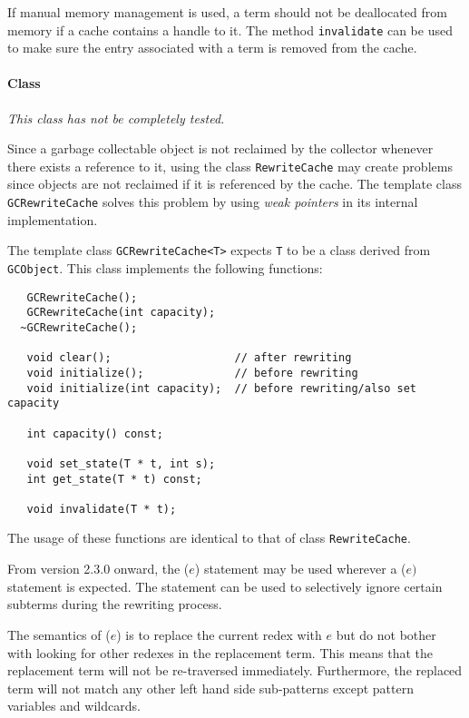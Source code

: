 \begin{Tips}  
If manual memory management is used, 
a term should not be deallocated from memory if a cache
contains a handle to it.  The method \verb|invalidate| can be used to
make sure the entry associated with a term is removed from the cache.
\end{Tips}

\paragraph{Class }

{\em This class has not be completely tested.}

Since a garbage collectable object is not reclaimed by the collector
whenever there exists a reference to it, using the class
\verb|RewriteCache| may create problems since objects are not reclaimed
if it is referenced by the cache.  The template class \verb|GCRewriteCache|
solves this problem by using {\em weak pointers} in its internal 
implementation.  

The template class \verb|GCRewriteCache<T>| expects \verb|T| to be
a class derived from \verb|GCObject|.   
This class implements the following functions:
\begin{verbatim}
   GCRewriteCache();
   GCRewriteCache(int capacity);
  ~GCRewriteCache();
 
   void clear();                   // after rewriting
   void initialize();              // before rewriting
   void initialize(int capacity);  // before rewriting/also set capacity
   
   int capacity() const;
               
   void set_state(T * t, int s);
   int get_state(T * t) const;

   void invalidate(T * t); 
\end{verbatim}

The usage of these functions are identical to that of class 
\verb|RewriteCache|.


   From version 2.3.0 onward, the ($e$) 
statement may be used wherever a ($e)$ statement is expected.
The  statement can be used to selectively ignore certain
subterms during the rewriting process.

The semantics of ($e$) is to replace the current redex
with $e$ but do not bother with looking for other redexes in the replacement
term.  This means that the replacement term will not be re-traversed
immediately.  Furthermore, the replaced term will not match any other
left hand side sub-patterns except pattern variables and wildcards.

